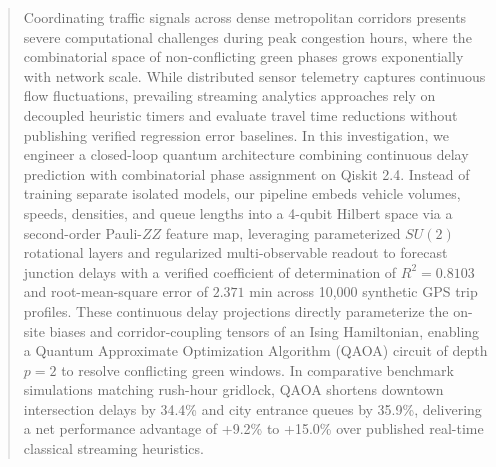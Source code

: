 \documentclass{llncs}
\begin{document}
\begin{abstract}
Coordinating traffic signals across dense metropolitan corridors presents severe computational challenges during peak congestion hours, where the combinatorial space of non-conflicting green phases grows exponentially with network scale. While distributed sensor telemetry captures continuous flow fluctuations, prevailing streaming analytics approaches rely on decoupled heuristic timers and evaluate travel time reductions without publishing verified regression error baselines. In this investigation, we engineer a closed-loop quantum architecture combining continuous delay prediction with combinatorial phase assignment on Qiskit 2.4. Instead of training separate isolated models, our pipeline embeds vehicle volumes, speeds, densities, and queue lengths into a 4-qubit Hilbert space via a second-order Pauli-$ZZ$ feature map, leveraging parameterized $SU(2)$ rotational layers and regularized multi-observable readout to forecast junction delays with a verified coefficient of determination of $R^2 = 0.8103$ and root-mean-square error of $2.371\text{ min}$ across 10,000 synthetic GPS trip profiles. These continuous delay projections directly parameterize the on-site biases and corridor-coupling tensors of an Ising Hamiltonian, enabling a Quantum Approximate Optimization Algorithm (QAOA) circuit of depth $p = 2$ to resolve conflicting green windows. In comparative benchmark simulations matching rush-hour gridlock, QAOA shortens downtown intersection delays by 34.4\% and city entrance queues by 35.9\%, delivering a net performance advantage of +9.2\% to +15.0\% over published real-time classical streaming heuristics.
\end{abstract}


\end{document}
